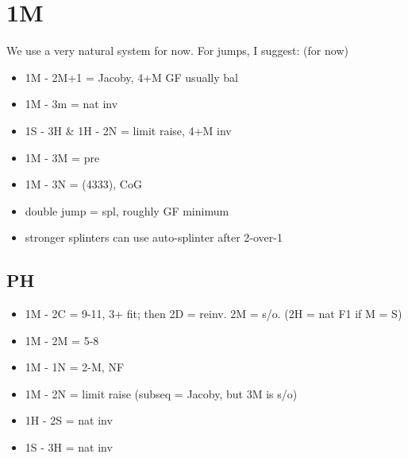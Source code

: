 \section{1M}

We use a very natural system for now. For jumps, I suggest: (for now)
\begin{itemize}
    \setlength\itemsep{0pt}
    \item 1M - 2M+1 = Jacoby, 4+M GF usually bal
    \item 1M - 3m = nat inv
    \item 1S - 3H \& 1H - 2N = limit raise, 4+M inv
    \item 1M - 3M = pre
    \item 1M - 3N = (4333), CoG
    \item double jump = spl, roughly GF minimum
    \item stronger splinters can use auto-splinter after 2-over-1
\end{itemize}

\subsection{PH}

\begin{itemize}
    \setlength\itemsep{0pt}
    \item 1M - 2C = 9-11, 3+ fit; then 2D = reinv. 2M = s/o. (2H = nat F1 if M = S)
    \item 1M - 2M = 5-8
    \item 1M - 1N = 2-M, NF
    \item 1M - 2N = limit raise (subseq = Jacoby, but 3M is s/o)
    \item 1H - 2S = nat inv
    \item 1S - 3H = nat inv
\end{itemize}


